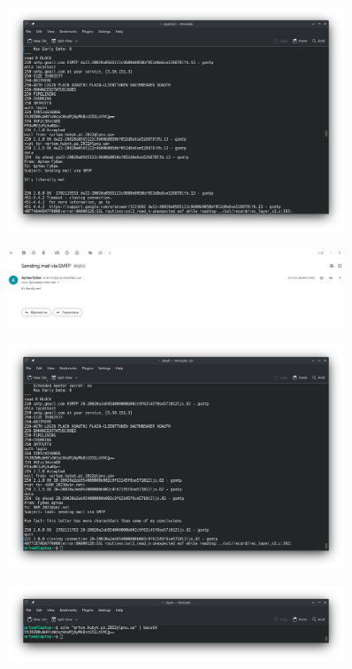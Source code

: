 \documentclass[12pt]{extarticle}
\begin{document}
\begin{figure}[H]
    \centering
    \includegraphics[width=0.90\textwidth]{me}
    \caption{}
\end{figure}



\begin{figure}[H]
    \centering
    \includegraphics[width=0.90\textwidth]{web}
    \caption{}
\end{figure}

\begin{figure}[H]
    \centering
    \includegraphics[width=0.90\textwidth]{Screenshot_20231209_162401}
    \caption{}
\end{figure}

\begin{figure}[H]
    \centering
    \includegraphics[width=0.90\textwidth]{base64}
    \caption{}
\end{figure}
\end{document}
